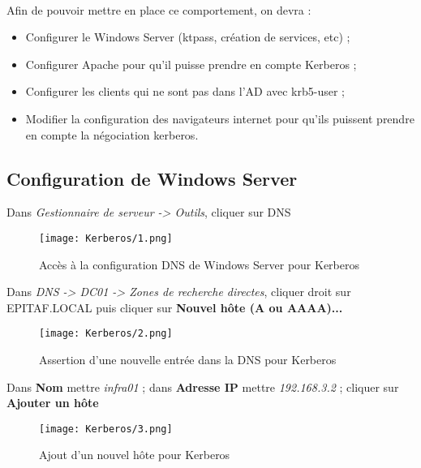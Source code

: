 \paragraph{}

  Afin de pouvoir mettre en place ce comportement, on devra : 
  \begin{itemize}
      \item Configurer le Windows Server (ktpass, création de services, etc) ;
      \item Configurer Apache pour qu'il puisse prendre en compte Kerberos ;
      \item Configurer les clients qui ne sont pas dans l'AD avec krb5-user ;
      \item Modifier la configuration des navigateurs internet pour qu'ils puissent prendre en compte la négociation kerberos.
  \end{itemize}
  
\pagebreak
  \subsection{Configuration de Windows Server}
  Dans \textit{Gestionnaire de serveur -> Outils}, cliquer sur DNS
  \begin{figure}[h!]
     \begin{center}
         \texttt{[image: Kerberos/1.png]}
         \caption{Accès à la configuration DNS de Windows Server pour Kerberos}
         \label{Debian_screenshots/Config/5}
     \end{center}
  \end{figure}
  \FloatBarrier

\pagebreak
  Dans \textit{DNS -> DC01 -> Zones de recherche directes}, cliquer droit sur EPITAF.LOCAL puis cliquer sur \textbf{Nouvel hôte (A ou AAAA)...}
  \begin{figure}[h!]
     \begin{center}
         \texttt{[image: Kerberos/2.png]}
         \caption{Assertion d'une nouvelle entrée dans la DNS pour Kerberos}
         \label{Debian_screenshots/Config/5}
     \end{center}
  \end{figure}
  \FloatBarrier

\pagebreak
  Dans \textbf{Nom} mettre \textit{infra01} ; dans \textbf{Adresse IP} mettre \textit{192.168.3.2} ; cliquer sur \textbf{Ajouter un hôte}
  \begin{figure}[h!]
     \begin{center}
         \texttt{[image: Kerberos/3.png]}
         \caption{Ajout d'un nouvel hôte pour Kerberos}
         \label{Debian_screenshots/Config/5}
     \end{center}
  \end{figure}
  \FloatBarrier

